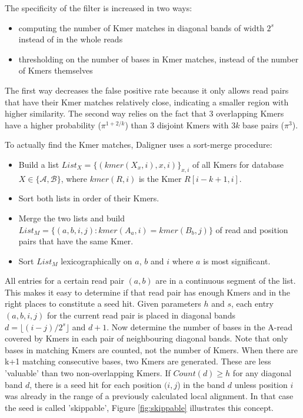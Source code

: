 \documentclass[../thesis.tex]{subfiles}
\begin{document}
The specificity of the filter is increased in two ways:
\begin{itemize}
\item computing the number of Kmer matches in diagonal bands of width $2^s$ instead of in the whole reads
\item thresholding on the number of bases in Kmer matches, instead of the number of Kmers themselves
\end{itemize}

The first way decreases the false positive rate because it only allows read pairs that have their Kmer matches relatively close, indicating a smaller region with higher similarity.
The second way relies on the fact that 3 overlapping Kmers have a higher probability ($\pi^{1+2/k}$) than 3 disjoint Kmers with $3k$ base pairs ($\pi^3$).


To actually find the Kmer matches, Daligner uses a sort-merge procedure:
\begin{itemize}
\item Build a list $List_X = \{(kmer(X_x,i),x,i)\}_{x,i}$ of all Kmers for database $X \in \{\mathcal{A},\mathcal{B}\}$, where $kmer(R,i)$ is the Kmer $R[i-k+1,i]$.
\item Sort both lists in order of their Kmers.
\item Merge the two lists and build $List_M=\{(a,b,i,j): kmer(A_a,i) = kmer(B_b,j)\}$ of read and position pairs that have the same Kmer.
\item Sort $List_M$ lexicographically on $a$, $b$ and $i$ where $a$ is most significant.
\end{itemize}

All entries for a certain read pair $(a,b)$ are in a continuous segment of the list.
This makes it easy to determine if that read pair has enough Kmers and in the right places to constitute a seed hit.
Given parameters $h$ and $s$, each entry $(a,b,i,j)$ for the current read pair is placed in diagonal bands $d = \lfloor(i-j)/2^s\rfloor$ and $d+1$.
Now determine the number of bases in the A-read covered by Kmers in each pair of neighbouring diagonal bands.
Note that only bases in matching Kmers are counted, not the number of Kmers.
When there are k+1 matching consecutive bases, two Kmers are generated.
These are less 'valuable' than two non-overlapping Kmers.
If $Count(d) \ge h$ for any diagonal band $d$, there is a seed hit for each position $(i,j$) in the band $d$ unless position $i$ was already in the range of a previously calculated local alignment.
In that case the seed is called 'skippable', Figure \ref{fig:skippable} illustrates this concept.
\end{document}
